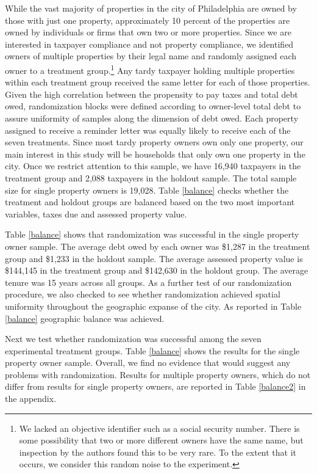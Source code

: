 \documentclass[12pt]{article}
\begin{document}
While the vast majority of properties in the city of Philadelphia are
owned by those with just one property, approximately 10 percent of the
properties are owned by individuals or firms that own two or more
properties. Since we are interested in taxpayer compliance and not
property compliance, we identified owners of multiple properties by
their legal name and randomly assigned each owner to a treatment
group.\footnote{We lacked an objective identifier such as a social
  security number.  There is some possibility that two or more different
  owners have the same name, but inspection by the authors found this
  to be very rare.  To the extent that it occurs, we consider this
  random noise to the experiment.} Any tardy taxpayer holding multiple
properties within each treatment group received the same letter for
each of those properties.  Given the high correlation between the
propensity to pay taxes and total debt owed, randomization blocks were
defined according to owner-level total debt to assure uniformity of
samples along the dimension of debt owed. Each property assigned to
receive a reminder letter was equally likely to receive each of the
seven treatments. Since most tardy property owners own only one
property, our main interest in this study will be households that only
own one property in the city. Once we restrict attention to this
sample, we have 16,940 taxpayers in the treatment group and 2,088
taxpayers in the holdout sample.  The total sample size for single
property owners is 19,028. Table \ref{balance} checks whether the
treatment and holdout groups are balanced based on the two most
important variables, taxes due and assessed property value.

Table \ref{balance} shows that randomization was successful in the
single property owner sample.  The average debt owed by each owner was
\$1,287 in the treatment group and \$1,233 in the holdout sample. The
average assessed property value is \$144,145 in the treatment group
and \$142,630 in the holdout group. The average tenure was 15 years
across all groups.  As a further test of our randomization procedure,
we also checked to see whether randomization achieved spatial
uniformity throughout the geographic expanse of the city. As reported
in Table \ref{balance} geographic balance was achieved.

Next we test whether randomization was successful among the seven
experimental treatment groups. Table \ref{balance} shows the results
for the single property owner sample. Overall, we find no evidence
that would suggest any problems with randomization. Results for
multiple property owners, which do not differ from results for single
property owners, are reported in Table \ref{balance2} in the appendix.
\end{document}
